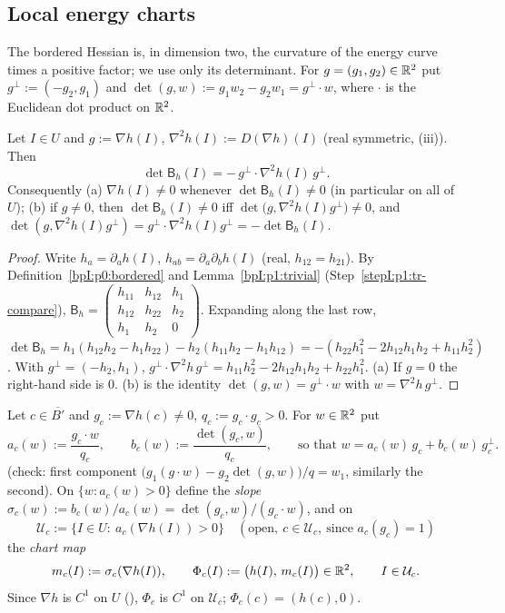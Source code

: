 \subsection{Local energy charts}\label{bpI:p3:sec-charts}

The bordered Hessian is, in dimension two, the curvature of the energy curve times a positive factor; we use only its determinant.
For $g=(g_1,g_2)\in\mathbb{R}^2$ put $g^\perp:=(-g_2,g_1)$ and $\det(g,w):=g_1w_2-g_2w_1=g^\perp\cdot w$, where $\cdot$ is the Euclidean dot product on $\mathbb{R}^2$.

\begin{lemma}\label{bpI:p3:det-identity}
Let $I\in U$ and $g:=\nabla h(I)$, $\nabla^2h(I):=D(\nabla h)(I)$ (real symmetric, (iii)). Then
\[
\det\mathsf B_h(I)=-\,g^\perp\!\cdot\nabla^2h(I)\,g^\perp .
\]
Consequently (a) $\nabla h(I)\ne0$ whenever $\det\mathsf B_h(I)\ne0$ (in particular on all of $U$); (b) if $g\ne0$, then
$\det\mathsf B_h(I)\ne0$ iff $\det\bigl(g,\nabla^2h(I)g^\perp\bigr)\ne0$, and $\det(g,\nabla^2h(I)g^\perp)=g^\perp\cdot\nabla^2h(I)g^\perp=-\det\mathsf B_h(I)$.
\end{lemma}
\begin{proof}
\label{stepI:p3:di-expand}
Write $h_a=\partial_ah(I)$, $h_{ab}=\partial_a\partial_bh(I)$ (real, $h_{12}=h_{21}$). By Definition~\ref{bpI:p0:bordered} and Lemma~\ref{bpI:p1:trivial}
(Step~\ref{stepI:p1:tr-compare}), $\mathsf B_h=\left(\begin{smallmatrix}h_{11}&h_{12}&h_1\\h_{12}&h_{22}&h_2\\h_1&h_2&0\end{smallmatrix}\right)$. Expanding along the last row,
$\det\mathsf B_h=h_1(h_{12}h_2-h_1h_{22})-h_2(h_{11}h_2-h_1h_{12})=-(h_{22}h_1^2-2h_{12}h_1h_2+h_{11}h_2^2)$.
With $g^\perp=(-h_2,h_1)$, $g^\perp\!\cdot\nabla^2h\,g^\perp=h_{11}h_2^2-2h_{12}h_1h_2+h_{22}h_1^2$.
\label{stepI:p3:di-conseq}
(a) If $g=0$ the right-hand side is $0$. (b) is the identity $\det(g,w)=g^\perp\cdot w$ with $w=\nabla^2h\,g^\perp$.
\end{proof}

\begin{definition}\label{bpI:p3:coordinates}
Let $c\in\overline{B'}$ and $g_c:=\nabla h(c)\ne0$, $q_c:=g_c\cdot g_c>0$. For $w\in\mathbb{R}^2$ put
\[
a_c(w):=\frac{g_c\cdot w}{q_c},\qquad b_c(w):=\frac{\det(g_c,w)}{q_c},\qquad\text{so that }w=a_c(w)\,g_c+b_c(w)\,g_c^\perp .
\]
(check: first component $\bigl(g_1(g\cdot w)-g_2\det(g,w)\bigr)/q=w_1$, similarly the second). On $\{w:a_c(w)>0\}$ define the \emph{slope}
$\sigma_c(w):=b_c(w)/a_c(w)=\det(g_c,w)/(g_c\cdot w)$, and on
\[
\mathcal U_c:=\{I\in U:\ a_c(\nabla h(I))>0\}\quad(\text{open},\ c\in\mathcal U_c,\ \text{since }a_c(g_c)=1)
\]
the \emph{chart map}
\[
m_c(I):=\sigma_c(\nabla h(I)),\qquad \Phi_c(I):=\bigl(h(I),\,m_c(I)\bigr)\in\mathbb{R}^2,\qquad I\in\mathcal U_c .
\]
Since $\nabla h$ is $C^1$ on $U$ (), $\Phi_c$ is $C^1$ on $\mathcal U_c$; $\Phi_c(c)=(h(c),0)$.
\end{definition}

